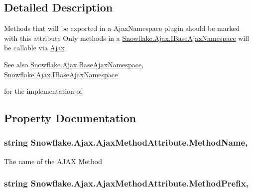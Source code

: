 \subsection{Detailed Description}
Methods that will be exported in a Ajax\+Namespace plugin should be marked with this attribute Only methods in a \hyperlink{interface_snowflake_1_1_ajax_1_1_i_base_ajax_namespace}{Snowflake.\+Ajax.\+I\+Base\+Ajax\+Namespace} will be callable via \hyperlink{namespace_snowflake_1_1_ajax}{Ajax} 

\begin{DoxySeeAlso}{See also}
\hyperlink{class_snowflake_1_1_ajax_1_1_base_ajax_namespace}{Snowflake.\+Ajax.\+Base\+Ajax\+Namespace}, \hyperlink{interface_snowflake_1_1_ajax_1_1_i_base_ajax_namespace}{Snowflake.\+Ajax.\+I\+Base\+Ajax\+Namespace}


\end{DoxySeeAlso}
for the implementation of  

\subsection{Property Documentation}
\hypertarget{class_snowflake_1_1_ajax_1_1_ajax_method_attribute_ace2bd4864bda17e7a7e6fdb3c4e3d82f}{}
\subsubsection[{Method\+Name}]{\setlength{\rightskip}{0pt plus 5cm}string Snowflake.\+Ajax.\+Ajax\+Method\+Attribute.\+Method\+Name\hspace{0.3cm}{\ttfamily [get]}, {\ttfamily [set]}}\label{class_snowflake_1_1_ajax_1_1_ajax_method_attribute_ace2bd4864bda17e7a7e6fdb3c4e3d82f}


The name of the A\+J\+A\+X Method 

\hypertarget{class_snowflake_1_1_ajax_1_1_ajax_method_attribute_a63f45d38381adbe0f3be6d740ccdefab}{}
\subsubsection[{Method\+Prefix}]{\setlength{\rightskip}{0pt plus 5cm}string Snowflake.\+Ajax.\+Ajax\+Method\+Attribute.\+Method\+Prefix\hspace{0.3cm}{\ttfamily [get]}, {\ttfamily [set]}}\label{class_snowflake_1_1_ajax_1_1_ajax_method_attribute_a63f45d38381adbe0f3be6d740ccdefab}



